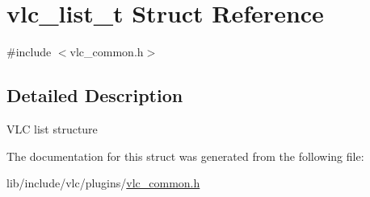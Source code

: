 \hypertarget{structvlc__list__t}{}\section{vlc\+\_\+list\+\_\+t Struct Reference}
\label{structvlc__list__t}


{\ttfamily \#include $<$vlc\+\_\+common.\+h$>$}



\subsection{Detailed Description}
V\+LC list structure 

The documentation for this struct was generated from the following file\+:\begin{DoxyCompactItemize}
\item 
lib/include/vlc/plugins/\hyperlink{vlc__common_8h}{vlc\+\_\+common.\+h}\end{DoxyCompactItemize}
